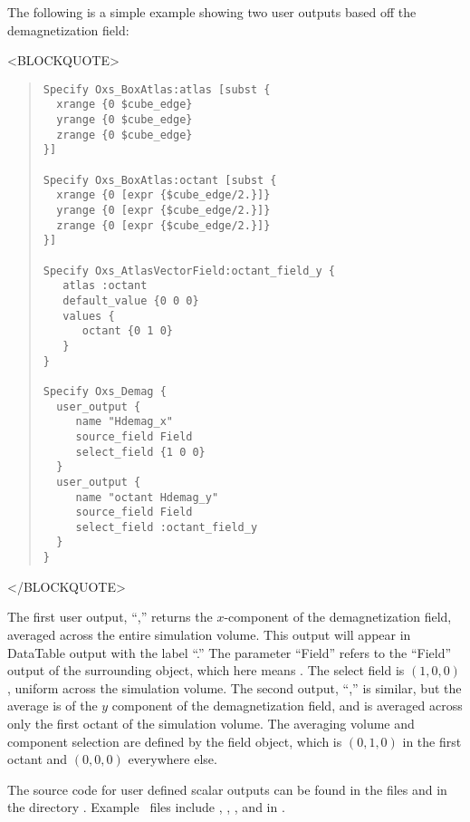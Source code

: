 The following is a simple example showing two user outputs based
off the demagnetization field:
\begin{rawhtml}
<BLOCKQUOTE>
\end{rawhtml}
\begin{quote}
\begin{verbatim}
Specify Oxs_BoxAtlas:atlas [subst {
  xrange {0 $cube_edge}
  yrange {0 $cube_edge}
  zrange {0 $cube_edge}
}]

Specify Oxs_BoxAtlas:octant [subst {
  xrange {0 [expr {$cube_edge/2.}]}
  yrange {0 [expr {$cube_edge/2.}]}
  zrange {0 [expr {$cube_edge/2.}]}
}]

Specify Oxs_AtlasVectorField:octant_field_y {
   atlas :octant
   default_value {0 0 0}
   values {
      octant {0 1 0}
   }
}

Specify Oxs_Demag {
  user_output {
     name "Hdemag_x"
     source_field Field
     select_field {1 0 0}
  }
  user_output {
     name "octant Hdemag_y"
     source_field Field
     select_field :octant_field_y
  }
}
\end{verbatim}
\end{quote}
\begin{rawhtml}
</BLOCKQUOTE>
\end{rawhtml}
The first user output, ``,'' returns the
$x$-component of the demagnetization field, averaged across the entire
simulation volume.  This output will appear in DataTable output with the
label ``.''  The  parameter
``Field'' refers to the ``Field'' output of the surrounding
 object, which here means .
The select field is $(1,0,0)$, uniform across the simulation volume.
The second output, ``,'' is similar, but the
average is of the $y$ component of the demagnetization field, and is
averaged across only the first octant of the simulation volume.  The
averaging volume and component selection are defined by the
 field object, which is $(0,1,0)$ in the first
octant and $(0,0,0)$ everywhere else.

The source code for user defined scalar outputs can be found in the
files  and  in the directory
.  Example \MIF\ files include ,
, , and  in
.

